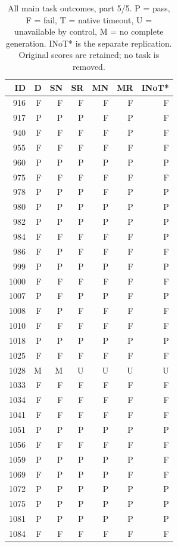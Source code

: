 \begin{table}[!htbp]\centering\footnotesize
\caption{All main task outcomes, part 5/5. P = pass, F = fail, T = native timeout, U = unavailable by control, M = no complete generation. INoT* is the separate replication. Original scores are retained; no task is removed.}
\begin{tabular*}{\textwidth}{@{\extracolsep{\fill}}rrrrrrr}\toprule
ID & D & SN & SR & MN & MR & INoT*\\\midrule
916 & F & F & F & F & F & F\\
917 & P & P & P & F & P & F\\
940 & F & F & F & F & P & F\\
955 & F & F & F & F & F & F\\
960 & P & P & P & P & P & P\\
975 & F & F & F & F & F & F\\
978 & P & P & P & F & P & P\\
980 & P & P & P & P & P & P\\
982 & P & P & P & P & P & P\\
984 & F & F & F & F & F & P\\
986 & F & P & F & F & F & F\\
999 & P & P & P & P & F & P\\
1000 & F & F & F & F & F & F\\
1007 & P & F & P & P & F & P\\
1008 & F & P & F & F & F & F\\
1010 & F & F & F & F & F & F\\
1018 & P & P & P & P & P & P\\
1025 & F & F & F & F & F & F\\
1028 & M & M & U & U & U & U\\
1033 & F & F & F & F & F & F\\
1034 & F & F & F & F & F & F\\
1041 & F & F & F & F & F & F\\
1051 & P & P & P & P & P & P\\
1056 & F & F & F & F & F & F\\
1059 & P & P & P & P & P & F\\
1069 & F & P & P & P & F & F\\
1072 & P & P & P & P & P & P\\
1075 & P & P & P & P & P & P\\
1081 & P & P & P & P & P & P\\
1084 & F & F & F & F & F & F\\

\end{tabular*}
\end{table}
